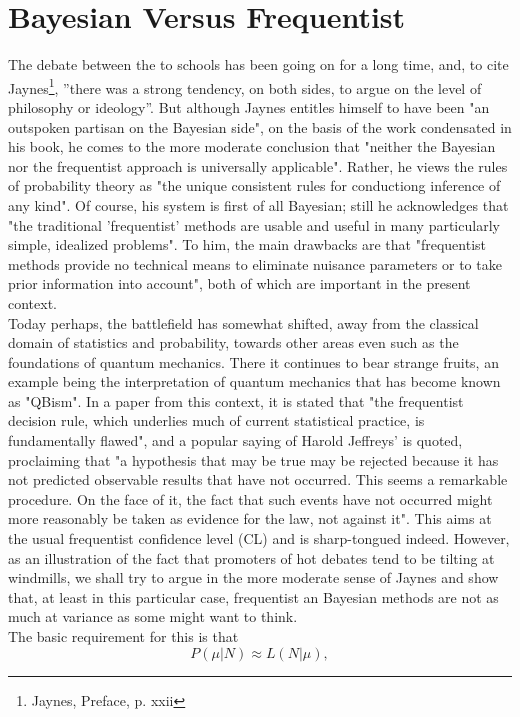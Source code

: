 \documentclass[aps,prb,twocolumn,showpacs,superscriptaddress,groupedaddress]{revtex4}  %
\begin{document}
\section{Bayesian Versus Frequentist}
The debate between the to schools has been going on for a long time, and, to cite Jaynes\footnote{Jaynes, Preface, p. xxii}, ''there was a strong tendency, on both sides, to argue on the level of philosophy or ideology''. But although Jaynes entitles himself to have been "an outspoken partisan on the Bayesian side", on the basis of the work condensated in his book, he comes to the more moderate conclusion that "neither the Bayesian nor the frequentist approach is universally applicable". Rather, he views the rules of probability theory as "the unique consistent rules for conductiong inference of any kind". Of course, his system is first of all Bayesian; still he acknowledges that "the traditional 'frequentist' methods are usable and useful in many particularly simple, idealized problems". To him, the main drawbacks are that "frequentist methods provide no technical means to eliminate nuisance parameters or to take prior information into account", both of which are important in the present context.\\
Today perhaps, the battlefield has somewhat shifted, away from the classical domain of statistics and probability, towards other areas even such as the foundations of quantum mechanics. There it continues to bear strange fruits, an example being the interpretation of quantum mechanics that has become known as "QBism"\cite{qbism}. In a paper from this context\cite{schack}, it is stated that "the frequentist decision rule, which underlies much of current statistical practice, is fundamentally flawed", and a popular saying of Harold Jeffreys' is quoted, proclaiming that "a hypothesis that
may be true may be rejected because it has not predicted observable results that have not occurred. This seems a remarkable procedure. On the face of it, the fact that such events have not occurred might more reasonably be taken as evidence for the law, not against it". This aims at the usual frequentist confidence level (CL) and is sharp-tongued indeed. However, as an illustration of the fact that promoters of hot debates tend to be tilting at windmills, we shall try to argue in the more moderate sense of Jaynes and show that, at least in this particular case, frequentist an Bayesian methods are not as much at variance as some might want to think.\\
The basic requirement for this is that 
\begin{equation}\label{eq:postlikeli}
P(\mu|N)\approx L(N|\mu),
\end{equation}
\end{document}
